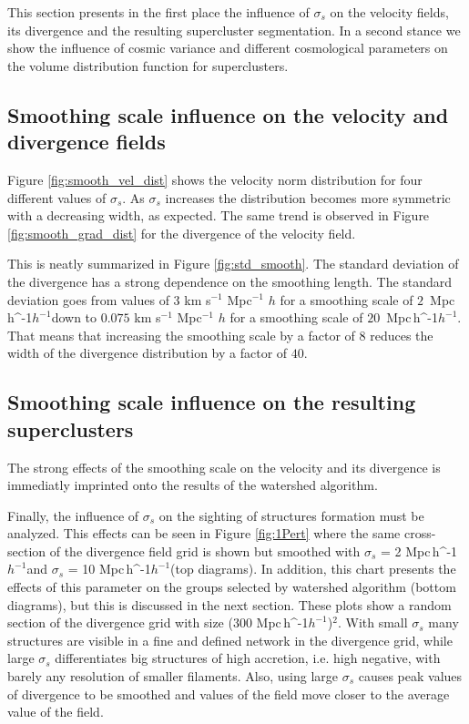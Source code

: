 \documentclass[usenatbib]{mnras}
\newcommand{\Mpch}{\,{\rm Mpc}\,\ifmmode h^{-1}\else $h^{-1}$\fi}
\begin{document}
This section presents in the first place the influence of $\sigma_s$
on the velocity fields, its divergence and the resulting supercluster
segmentation. 
In a second stance we show the influence of cosmic variance and
different cosmological parameters on the volume distribution function
for superclusters. 

\subsection{Smoothing scale influence on the velocity and divergence fields}
\label{VDF effects}

Figure \ref{fig:smooth_vel_dist} shows the velocity norm distribution
for four different values of $\sigma_s$. 
As $\sigma_s$ increases the distribution becomes more symmetric with a
decreasing width, as expected.
The same trend is observed in Figure \ref{fig:smooth_grad_dist} for
the divergence of the velocity field.

This is neatly summarized in  Figure \ref{fig:std_smooth}.
The standard deviation of the divergence has a strong dependence on
the smoothing length.
The standard deviation goes from values of $3$  km s$^{-1}$ Mpc$^{-1}$ $h$ 
for a smoothing scale of $2$ \Mpch down to $0.075$ km s$^{-1}$
Mpc$^{-1}$ $h$ for a smoothing scale of $20$ \Mpch.
That means that increasing the smoothing scale by a factor of $8$
reduces the width of the divergence distribution by a factor of
$40$. 

\subsection{Smoothing scale influence on the resulting superclusters}
\label{sec:superclusters_influence}

The strong effects of the smoothing scale on the velocity and its
divergence is immediatly imprinted onto the results of the watershed
algorithm.


Finally, the influence of $\sigma_s$ on the sighting of structures
formation must be analyzed. This effects can be seen in Figure
\ref{fig:1Pert} where the same cross-section of the divergence field
grid is shown but smoothed with $\sigma_s$ = 2\,\Mpch and $\sigma_s$ =
10\,\Mpch (top diagrams). In addition, this chart presents the effects
of this parameter on the groups selected by watershed algorithm
(bottom diagrams), but this is discussed in the next section. These
plots show a random section of the divergence grid with size
(300\,\Mpch)$^2$. With small $\sigma_{s}$ many structures are visible
in a fine and defined network in the divergence grid, while large
$\sigma_{s}$ differentiates big structures of high accretion,
i.e. high negative, with barely any resolution of smaller
filaments. Also, using large $\sigma_{s}$ causes peak values of
divergence to be smoothed and values of the field move closer to  the
average value of the field.  
\end{document}

